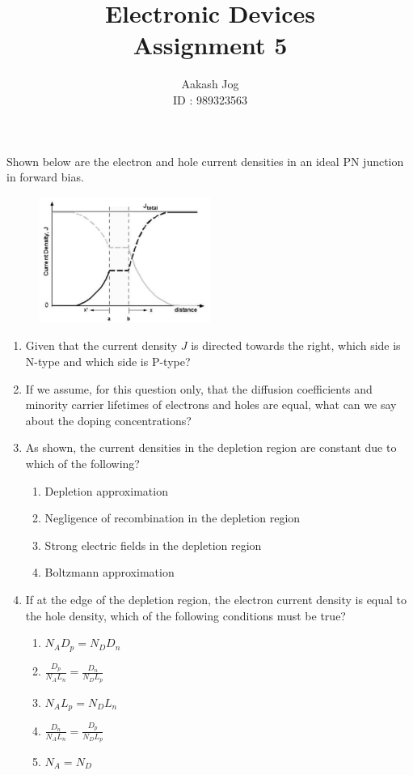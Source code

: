 \documentclass[fleqn, a4paper, 10pt, oneside]{amsart}
\title
[
	Electronic Devices : Assignment 5
]
{
	Electronic Devices\\
	Assignment 5
}
\author
{
	Aakash Jog\\
	ID : 989323563
}
\date{\formatdate{14}{4}{2016}}
\theoremstyle{definition}
\theoremstyle{theorem}
\begin{document}
\maketitle

\begin{question}
	Shown below are the electron and hole current densities in an ideal PN junction in forward bias.
	\begin{figure}[H]
		\centering
		\includegraphics[width = 0.5\textwidth]{fig1.png}
	\end{figure}
	\begin{enumerate}
		\item
			Given that the current density $J$ is directed towards the right, which side is N-type and which side is P-type?
		\item
			If we assume, for this question only, that the diffusion coefficients and minority carrier lifetimes of electrons and holes are equal, what can we say about the doping concentrations?
		\item
			As shown, the current densities in the depletion region are constant due to which of the following?
			\begin{enumerate}
				\item Depletion approximation
				\item Negligence of recombination in the depletion region
				\item Strong electric fields in the depletion region
				\item Boltzmann approximation
			\end{enumerate}
		\item
			If at the edge of the depletion region, the electron current density is equal to the hole density, which of the following conditions must be true?
			\begin{enumerate}
				\item $N_A D_p = N_D D_n$
				\item $\frac{D_p}{N_A L_n} = \frac{D_n}{N_D L_p}$
				\item $N_A L_p = N_D L_n$
				\item $\frac{D_n}{N_A L_n} = \frac{D_p}{N_D L_p}$
				\item $N_A = N_D$
			\end{enumerate}
	\end{enumerate}
\end{question}
\end{document}
